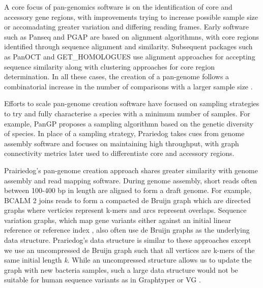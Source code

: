 \documentclass{article}
\begin{document}
A core focus of pan-genomics software is on the identification of core and accessory gene regions, with improvements trying to increase possible sample size or accomadating greater variation and differing reading frames.
Early software such as Panseq \cite{laing2010pan} and PGAP \cite{zhao2011pgap} are based on alignment algorithmns, with core regions identified through sequence alignment and similarity.
Subsequent packages such as PanOCT \cite{fouts2012panoct} and GET_HOMOLOGUES \cite{contreras2013get_homologues} use alignment approaches for accepting sequence similarity along with clustering approaches for core region determination.
In all these cases, the creation of a pan-genome follows a combinatorial increase in the number of comparisons with a larger sample size \cite{vernikos2015ten}.

Efforts to scale pan-genome creation software have focused on sampling strategies to try and fully characterise a species with a minimum number of samples.
For example, PanGP \cite{zhao2014pangp} proposes a sampling algorithmn based on the genetic diversity of species.
In place of a sampling strategy, Prariedog takes cues from genome assembly software and focuses on maintaining high throughput, with graph connectivity metrics later used to differentiate core and accessory regions.


Prairiedog's pan-genome creation approach shares greater similarity with genome assembly and read mapping software.
During genome assembly, short reads often between 100-400 bp in length are aligned to form a draft genome.
For example, BCALM 2 \cite{chikhi2016compacting} joins reads to form a compacted de Bruijn graph which are directed graphs where verticies represent k-mers and arcs represent overlaps.
Sequence variation graphs, which map gene variants either against an initial linear reference \cite{eggertsson2017graphtyper} or reference index \cite{garrison2018variation}, also often use de Bruijn graphs as the underlying data structure.
Prariedog's data structure is similar to these approaches except we use an uncompressed de Bruijn graph such that all vertices are k-mers of the same initial length \textit{k}.
While an uncompressed structure allows us to update the graph with new bacteria samples, such a large data structure would not be suitable for human sequence variants as in Graphtyper \cite{eggertsson2017graphtyper} or VG \cite{garrison2018variation}.
\end{document}
